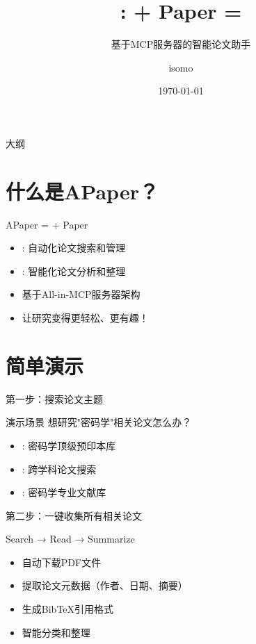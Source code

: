 \documentclass{beamer}
\title{\red{APaper}: \blue{AI} + Paper = \green{研究神器}}
\subtitle{基于MCP服务器的智能论文助手}
\author{isomo}
\date{\today}
\begin{document}
\begin{frame}
  \titlepage
\end{frame}

\begin{frame}{大纲}
  \tableofcontents
\end{frame}

\section{什么是APaper？}
\begin{frame}{APaper =  + Paper}
  \begin{itemize}
    \item {}: 自动化论文搜索和管理
    \item {}: 智能化论文分析和整理
    \item 基于All-in-MCP服务器架构
    \item 让研究变得更轻松、更有趣！
  \end{itemize}
\end{frame}

\section{简单演示}
\begin{frame}{第一步：搜索论文主题}
  \begin{block}{演示场景}
    想研究"密码学"相关论文怎么办？
  \end{block}
  
  \pause
  
  \begin{itemize}
    \item {}: 密码学顶级预印本库
    \item {}: 跨学科论文搜索
    \item {}: 密码学专业文献库
  \end{itemize}
\end{frame}

\begin{frame}{第二步：一键收集所有相关论文}
  \begin{center}
    \huge Search → Read → Summarize
  \end{center}
  
  \begin{itemize}
    \item 自动下载PDF文件
    \item 提取论文元数据（作者、日期、摘要）
    \item 生成BibTeX引用格式
    \item 智能分类和整理
  \end{itemize}
\end{frame}
\end{document}
